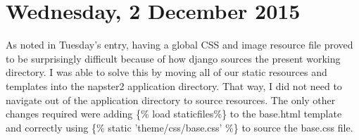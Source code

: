 \documentclass[a4paper,12pt]{article}
\begin{document}
\section{Wednesday, 2 December 2015}

As noted in Tuesday's entry, having a global CSS and image resource file proved
to be surprisingly difficult because of how django sources the present working
directory. I was able to solve this by moving all of our static resources and
templates into the napster2 application directory. That way, I did not need to
navigate out of the application directory to source resources. The only other
changes required were adding \{\% load staticfiles\%\} to the base.html template
and correctly using \{\% static 'theme/css/base.css' \%\} to source the base.css
file.
\end{document}
